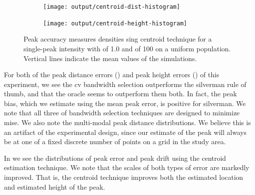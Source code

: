 \begin{figure}[htbp]
    \centering
    \begin{subfigure}[b]{0.45\textwidth}
        \texttt{[image: output/centroid-dist-histogram]}
    \end{subfigure}
    \begin{subfigure}[b]{0.45\textwidth}
        \texttt{[image: output/centroid-height-histogram]}
    \end{subfigure}
    \caption[Centroid accuracy: Single-peak of 100 on uniform population]{Peak accuracy measures densities sing centroid technique for a single-peak intensity with  of 1.0 and  of 100 on a uniform population. Vertical lines indicate the mean values of the simulations.}
    \label{fig:centroids:unif_100_1.0_1h}
\end{figure}

For both of the peak distance errors () and peak height errors () of this experiment,
we see the \gls{cv} bandwidth selection outperforms the \gls{silverman} rule of thumb, and that the \gls{oracle} seems to outperform them both.
In fact, the \gls{peak bias}, which we estimate using the mean \gls{peak error},
is positive for \gls{silverman}.
We note that all three of bandwidth selection techniques are designed to minimize \gls{mise}.
We also note the multi-modal peak distance distributions.
We believe this is an artifact of the experimental design,
since our estimate of the peak will always be at one of a fixed discrete number of points on a grid in the study area.

In  we see the distributions of \gls{peak error} and \gls{peak drift} using the centroid estimation technique.
We note that the scales of both types of error are markedly improved.
That is, the centroid technique improves both the estimated location and estimated height of the peak.

